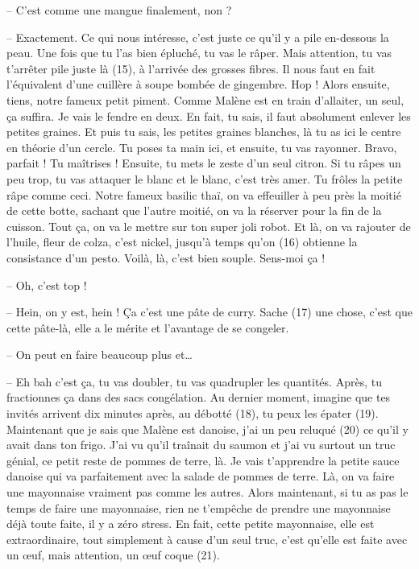 \documentclass[11pt, french]{report}
\begin{document}
-- C’est comme une mangue finalement, non ?

-- Exactement. Ce qui nous intéresse, c’est juste ce qu’il y a pile en-dessous
la peau. Une fois que tu l’as bien épluché, tu vas le râper. Mais attention, tu
vas t’arrêter pile juste là (15), à l’arrivée des grosses fibres. Il nous faut
en fait l’équivalent d’une cuillère à soupe bombée de gingembre. Hop ! Alors
ensuite, tiens, notre fameux petit piment. Comme Malène est en train d’allaiter,
un seul, ça suffira. Je vais le fendre en deux. En fait, tu sais, il faut
absolument enlever les petites graines. Et puis tu sais, les petites graines
blanches, là tu as ici le centre en théorie d’un cercle. Tu poses ta main ici,
et ensuite, tu vas rayonner. Bravo, parfait ! Tu maîtrises ! Ensuite, tu mets le
zeste d’un seul citron. Si tu râpes un peu trop, tu vas attaquer le blanc et le
blanc, c’est très amer. Tu frôles la petite râpe comme ceci. Notre fameux basilic
thaï, on va effeuiller à peu près la moitié de cette botte, sachant que l’autre
moitié, on va la réserver pour la fin de la cuisson. Tout ça, on va le mettre sur
ton super joli robot. Et là, on va rajouter de l’huile, fleur de colza, c’est
nickel, jusqu’à temps qu’on (16) obtienne la consistance d’un pesto. Voilà, là,
c’est bien souple. Sens-moi ça !

-- Oh, c’est top !

-- Hein, on y est, hein ! Ça c’est une pâte de curry. Sache (17) une chose, c’est
que cette pâte-là, elle a le mérite et l’avantage de se congeler.

-- On peut en faire beaucoup plus et…

-- Eh bah c’est ça, tu vas doubler, tu vas quadrupler les quantités. Après, tu
fractionnes ça dans des sacs congélation. Au dernier moment, imagine que tes
invités arrivent dix minutes après, au débotté (18), tu peux les épater (19).
Maintenant que je sais que Malène est danoise, j’ai un peu reluqué (20) ce qu’il
y avait dans ton frigo. J’ai vu qu’il traînait du saumon et j’ai vu surtout un
truc génial, ce petit reste de pommes de terre, là. Je vais t’apprendre la petite
sauce danoise qui va parfaitement avec la salade de pommes de terre. Là, on va
faire une mayonnaise vraiment pas comme les autres. Alors maintenant, si tu as
pas le temps de faire une mayonnaise, rien ne t’empêche de prendre une mayonnaise
déjà toute faite, il y a zéro stress. En fait, cette petite mayonnaise, elle est
extraordinaire, tout simplement à cause d’un seul truc, c’est qu’elle est faite
avec un œuf, mais attention, un œuf coque (21).
\end{document}
